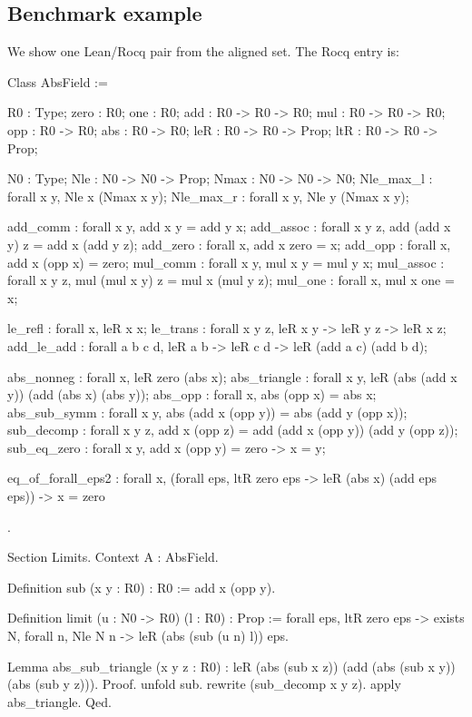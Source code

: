 \documentclass{article}
\theoremstyle{plain}
\theoremstyle{definition}
\theoremstyle{remark}
\begin{document}
	\subsection{Benchmark example}
	\label{app:benchmark}
	We show one Lean/Rocq pair from the aligned set. The Rocq entry is:
	
	\begin{rocq}
		Class AbsField := {
			R0   : Type;
			zero : R0;
			one  : R0;
			add  : R0 -> R0 -> R0;
			mul  : R0 -> R0 -> R0;
			opp  : R0 -> R0;
			abs  : R0 -> R0;
			leR  : R0 -> R0 -> Prop;
			ltR  : R0 -> R0 -> Prop;
			
			
			N0       : Type;
			Nle      : N0 -> N0 -> Prop;
			Nmax     : N0 -> N0 -> N0;
			Nle_max_l : forall x y, Nle x (Nmax x y);
			Nle_max_r : forall x y, Nle y (Nmax x y);
			
			add_comm  : forall x y, add x y = add y x;
			add_assoc : forall x y z, add (add x y) z = add x (add y z);
			add_zero  : forall x, add x zero = x;
			add_opp   : forall x, add x (opp x) = zero;
			mul_comm  : forall x y, mul x y = mul y x;
			mul_assoc : forall x y z, mul (mul x y) z = mul x (mul y z);
			mul_one   : forall x, mul x one = x;
			
			le_refl   : forall x, leR x x;
			le_trans  : forall x y z, leR x y -> leR y z -> leR x z;
			add_le_add : forall a b c d, leR a b -> leR c d -> leR (add a c)
			(add b d);
			
			abs_nonneg : forall x, leR zero (abs x);
			abs_triangle : forall x y, leR (abs (add x y)) (add (abs x) (abs y));
			abs_opp : forall x, abs (opp x) = abs x;
			abs_sub_symm : forall x y, abs (add x (opp y)) = abs (add y (opp x));
			sub_decomp : forall x y z, add x (opp z) = add (add x (opp y)) 
			(add y (opp z));
			sub_eq_zero : forall x y, add x (opp y) = zero -> x = y;
			
			
			eq_of_forall_eps2 : forall x, (forall eps, ltR zero eps -> leR 
			(abs x) (add eps eps)) -> x = zero
		}.
		
		Section Limits.
		Context {A : AbsField}.
		
		Definition sub (x y : R0) : R0 := add x (opp y).
		
		Definition limit (u : N0 -> R0) (l : R0) : Prop :=
		forall eps, ltR zero eps -> exists N, forall n, Nle N n -> leR
		(abs (sub (u n) l)) eps.
		
		Lemma abs_sub_triangle (x y z : R0) :
		leR (abs (sub x z)) (add (abs (sub x y)) (abs (sub y z))).
		Proof.
		unfold sub.
		rewrite (sub_decomp x y z).
		apply abs_triangle.
		Qed.
		

\end{rocq}
\end{document}
